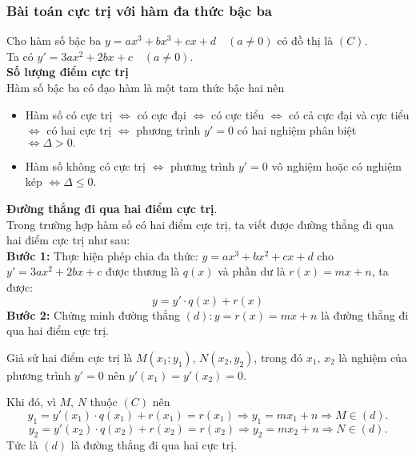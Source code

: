 \subsubsection{Bài toán cực trị với hàm đa thức bậc ba}
Cho hàm số bậc ba $y=a{x^{3}}+b{x^{3}}+cx+d\quad (a\neq 0)$ có đồ thị là $\left( C \right)$.\\
Ta có $y'=3a{x^2}+2bx+c \quad \left( a\neq 0 \right)$.\\
\textbf{Số lượng điểm cực trị}\\
Hàm số bậc ba có đạo hàm là một tam thức bậc hai nên
\begin{itemize}
	\item Hàm số có cực trị $\Leftrightarrow$ có cực đại $\Leftrightarrow$ có cực tiểu $\Leftrightarrow $ có cả cực đại và cực tiểu $\Leftrightarrow$ có hai cực trị $\Leftrightarrow $ phương trình $y'=0$ có hai nghiệm phân biệt $\Leftrightarrow \Delta >0.$ 
	\item Hàm số không có cực trị $\Leftrightarrow$ phương trình $y'=0$ vô nghiệm hoặc có nghiệm kép $\Leftrightarrow \Delta \leq 0.$
\end{itemize}
\begin{note}
	\textbf{Đường thẳng đi qua hai điểm cực trị}.\\
	Trong trường hợp hàm số có hai điểm cực trị, ta viết được đường thẳng đi qua hai điểm cực trị như sau:\\
	\checkmark \quad \textbf{Bước 1:} Thực hiện phép chia đa thức: $y=ax^3+bx^2+cx+d$ cho $y'=3ax^2+2bx+c$ được thương là $q\left( x \right)$ và phần dư là $r\left( x \right)=mx+n$, ta được:
	$$y=y'\cdot q\left( x \right)+r\left( x \right)$$
	\checkmark \quad \textbf{Bước 2:} Chứng minh đường thẳng $\left( d \right):y=r\left( x \right)=mx+n$ là đường thẳng đi qua hai điểm cực trị.
	
	Giả sử hai điểm cực trị là $M\left( x_1;y_1 \right)$, $N\left( x_2,y_2 \right)$, trong đó $x_1$, $x_2$ là nghiệm của phương trình $y'=0$ nên $y'\left( x_1 \right)=y'\left( x_2\right)=0$.
	
	Khi đó, vì $M$, $N$ thuộc $\left( C \right)$ nên
	$$y_1=y'\left( x_1 \right)\cdot q\left( x_1 \right)+r\left( x_1 \right)=r\left( x_1 \right)\Rightarrow y_1=mx_1+n\Rightarrow M\in \left( d \right).$$
	$$y_2=y'\left( x_2\right)\cdot q\left( x_2\right)+r\left( x_2\right)=r\left( x_2\right)\Rightarrow y_2=mx_2+n\Rightarrow N\in \left( d \right).$$
	Tức là $\left( d \right)$ là đường thẳng đi qua hai cực trị.
\end{note}
